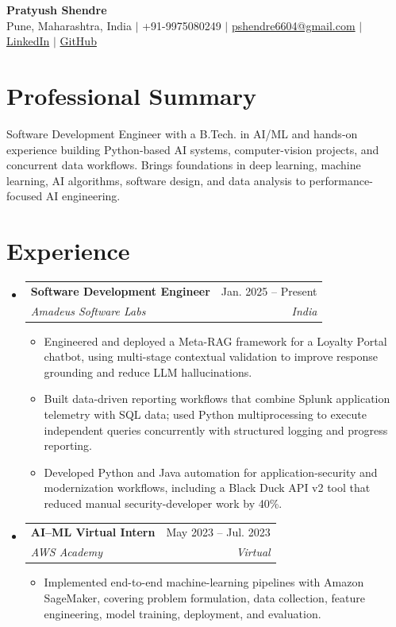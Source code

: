 \documentclass[a4paper,10pt]{article}
\makeatletter
\newcommand{\resumeItem}[1]{\item \small{#1}}
\newcommand{\resumeSubheading}[4]{\item \begin{tabularx}{\textwidth}{@{}Xr@{}}\textbf{#1} & #2 \\ \textit{\small #3} & \textit{\small #4}\end{tabularx}\vspace{-5pt}}
\makeatother
\begin{document}
\begin{center}
  {\Large\bfseries Pratyush Shendre}\\[-1pt]
  \small Pune, Maharashtra, India $|$ +91-9975080249 $|$ \href{mailto:pshendre6604@gmail.com}{pshendre6604@gmail.com} $|$ \href{https://linkedin.com/in/pratyush-shendre-2256a7223/}{LinkedIn} $|$ \href{https://github.com/PratyushS04}{GitHub}
\end{center}

\section{Professional Summary}
\small Software Development Engineer with a B.Tech. in AI/ML and hands-on experience building Python-based AI systems, computer-vision projects, and concurrent data workflows. Brings foundations in deep learning, machine learning, AI algorithms, software design, and data analysis to performance-focused AI engineering.

\section{Experience}
\begin{itemize}[leftmargin=0in,label={}]
  \resumeSubheading{Software Development Engineer}{Jan. 2025 -- Present}{Amadeus Software Labs}{India}
  \begin{itemize}
    \resumeItem{Engineered and deployed a Meta-RAG framework for a Loyalty Portal chatbot, using multi-stage contextual validation to improve response grounding and reduce LLM hallucinations.}
    \resumeItem{Built data-driven reporting workflows that combine Splunk application telemetry with SQL data; used Python multiprocessing to execute independent queries concurrently with structured logging and progress reporting.}
    \resumeItem{Developed Python and Java automation for application-security and modernization workflows, including a Black Duck API v2 tool that reduced manual security-developer work by 40\%.}
  \end{itemize}
  \resumeSubheading{AI--ML Virtual Intern}{May 2023 -- Jul. 2023}{AWS Academy}{Virtual}
  \begin{itemize}
    \resumeItem{Implemented end-to-end machine-learning pipelines with Amazon SageMaker, covering problem formulation, data collection, feature engineering, model training, deployment, and evaluation.}
  \end{itemize}
\end{itemize}
\end{document}
